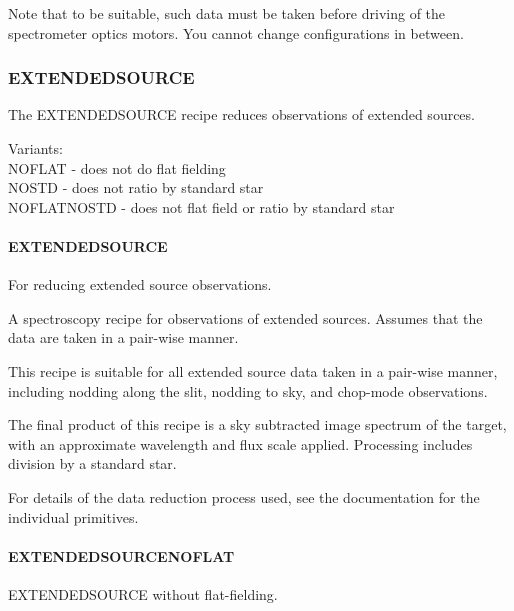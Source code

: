 \documentclass[twoside,11pt]{article}
\renewcommand{\_}{\texttt{\symbol{95}}}
\begin{document}
Note that to be suitable, such data must be taken before driving
of the spectrometer optics motors. You cannot change configurations
in between.


\subsubsection{EXTENDED\_SOURCE}

The EXTENDED\_SOURCE recipe reduces observations of extended sources.

Variants: \\
\_NOFLAT - does not do flat fielding \\
\_NOSTD - does not ratio by standard star \\
\_NOFLAT\_NOSTD - does not flat field or ratio by standard star \\

\paragraph{EXTENDED\_SOURCE\label{EXTENDED_SOURCE}}


For reducing extended source observations.


\mbox{}


A spectroscopy recipe for observations of extended sources.
Assumes that the data are taken in a pair-wise manner.



This recipe is suitable for all extended source data taken in a pair-wise
manner, including nodding along the slit, nodding to sky, and
chop-mode observations.



The final product of this recipe is a sky subtracted image spectrum of
the target, with an approximate wavelength and flux scale
applied. Processing includes division by a standard star.



For details of the data reduction process used, see the documentation
for the individual primitives.

\paragraph{EXTENDED\_SOURCE\_NOFLAT\label{EXTENDED_SOURCE_NOFLAT}}


EXTENDED\_SOURCE without flat-fielding.
\end{document}
